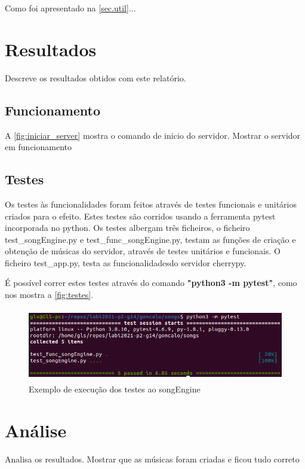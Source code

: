 \documentclass{report}
\begin{document}
Como foi apresentado na \autoref{sec.util}...


\chapter{Resultados}
\label{chap.resultados}
Descreve os resultados obtidos com este relatório.

\section{Funcionamento}
\label{sec:funcionamento}

A \autoref{fig:iniciar_server} mostra o comando de inicio do servidor.
Mostrar o servidor em funcionamento

\section{Testes}
\label{sec:testes}

Os testes às funcionalidades foram feitos através de testes funcionais e unitários criados para 
o efeito. Estes testes são corridos usando a ferramenta pytest incorporada no python. 
Os testes albergam três ficheiros, o ficheiro test\_songEngine.py e test\_func\_songEngine.py, 
testam as funções de criação e obtenção de músicas do servidor, através de testes unitários e
funcionais. O ficheiro test\_app.py, testa as funcionalidadesdo servidor cherrypy.

É possível correr estes testes através do comando \textbf{"python3 -m pytest"}, como nos mostra 
a \autoref{fig:testes}.

\begin{figure}[ht]
\center 
\includegraphics[height=90pt]{img/pytest.png}
\caption{Exemplo de execução dos testes ao songEngine}
\label{fig:testes}
\end{figure}


\chapter{Análise}
\label{chap.analise}
Analisa os resultados.
Mostrar que as músicas foram criadas e ficou tudo correto
\end{document}
